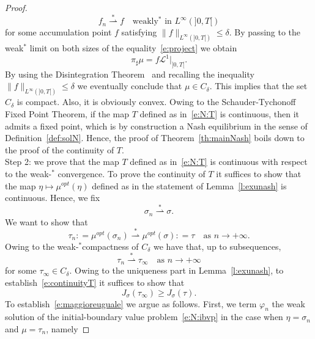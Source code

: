 \documentclass[11pt,leqno]{amsart}
\numberwithin{equation}{section}
\begin{document}
\begin{proof}
$$
    f_n {\stackrel{*}{\rightharpoonup}} f \quad \text{weakly$^\ast$ in $L^\infty (]0, T[)$}
$$
for some accumulation point $f$ satisfying $\| f \|_{L^\infty (]0, T[ )} \leq \delta$. 
By passing to the weak$^\ast$ limit on both sizes of the equality~\eqref{e:project} we obtain 
$$
     \pi_\sharp \mu = f \mathcal  L^1 \big|_{]0, T[} .
$$ 
By using the Disintegration Theorem~\cite[Theorem 2.28]{AmbrosioFuscoPallara} and recalling the inequality $\| f \|_{L^\infty (]0, T[ )} \leq \delta$ we eventually conclude that $\mu \in C_\delta$.  This implies that the set $C_\delta$ is compact. Also, it is obviously convex. Owing to the  
Schauder-Tychonoff Fixed Point Theorem, if the map $T$ defined as in~\eqref{e:N:T} is continuous, then it admits a fixed point, which is by construction a Nash equilibrium in the sense of Definition~\ref{def:solN}. Hence, the proof of Theorem~\ref{th:mainNash} boils down to the proof of the continuity of $T$. \\
{\sc Step 2:} we prove that the map $T$ defined as in~\eqref{e:N:T} is continuous with respect to the weak-$^\ast$ convergence. To prove the continuity of $T$  it suffices to show that the map $\eta \mapsto \mu^{opt}(\eta)$ defined as in the statement of Lemma~\ref{l:exunash} is continuous. Hence, we fix 
\begin{equation}
\label{e:sigmaenne}
  \sigma_n {\stackrel{*}{\rightharpoonup}} \sigma. 
\end{equation}
We want to show that 
\begin{equation}
\label{e:continuityT}
      \tau_n : = \mu^{opt}(\sigma_n)
      {\stackrel{*}{\rightharpoonup}} \mu^{opt}(\sigma): = \tau \quad \text{as $n \to + \infty$}.
\end{equation}
Owing to the weak-$^\ast$compactness of $C_\delta$ we have that, up to subsequences, 
\begin{equation}
\label{e:continuityTi}
      \tau_n       {\stackrel{*}{\rightharpoonup}} \tau_\infty \quad \text{as $n \to + \infty$}
\end{equation}
for some $\tau_\infty \in C_\delta$. Owing to the uniqueness part in 
Lemma~\ref{l:exunash}, to establish~\eqref{e:continuityT} it suffices to show that
\begin{equation}
\label{e:maggioreuguale}
        J_\sigma (\tau_\infty) \ge J_\sigma \left( \tau \right).
\end{equation}
To establish~\eqref{e:maggioreuguale} we argue as follows. First, we term  ${\varphi}_n$ the weak solution of the initial-boundary value problem~\eqref{e:N:ibvp} in the case when $\eta=\sigma_n$ and $\mu=\tau_n$, namely

\end{proof}
\end{document}
